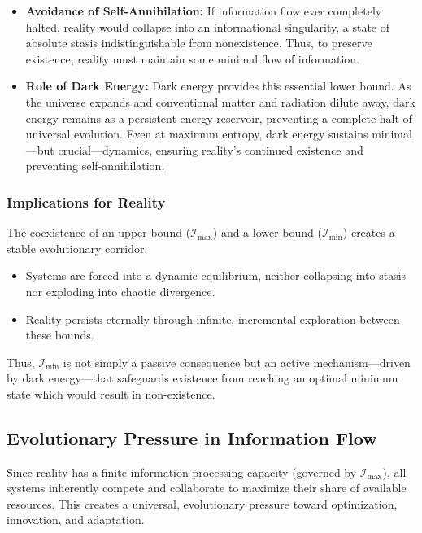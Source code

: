 \documentclass[12pt]{article}
\begin{document}
\begin{itemize}
    \item \textbf{Avoidance of Self-Annihilation:}  
    If information flow ever completely halted, reality would collapse into an informational singularity, a state of absolute stasis indistinguishable from nonexistence. Thus, to preserve existence, reality must maintain some minimal flow of information.

    \item \textbf{Role of Dark Energy:}  
    Dark energy provides this essential lower bound. As the universe expands and conventional matter and radiation dilute away, dark energy remains as a persistent energy reservoir, preventing a complete halt of universal evolution. Even at maximum entropy, dark energy sustains minimal—but crucial—dynamics, ensuring reality's continued existence and preventing self-annihilation.
\end{itemize}


\subsubsection{Implications for Reality}

The coexistence of an upper bound (\( \mathcal{I}_{\text{max}} \)) and a lower bound (\( \mathcal{I}_{\text{min}} \)) creates a stable evolutionary corridor:

\begin{itemize}
    \item Systems are forced into a dynamic equilibrium, neither collapsing into stasis nor exploding into chaotic divergence.
    \item Reality persists eternally through infinite, incremental exploration between these bounds.
\end{itemize}

Thus, \( \mathcal{I}_{\text{min}} \) is not simply a passive consequence but an active mechanism—driven by dark energy—that safeguards existence from reaching an optimal minimum state which would result in non-existence.


\subsection{Evolutionary Pressure in Information Flow}

Since reality has a finite information-processing capacity (governed by \( \mathcal{I}_{\text{max}} \)), all systems inherently compete and collaborate to maximize their share of available resources. This creates a universal, evolutionary pressure toward optimization, innovation, and adaptation.
\end{document}
